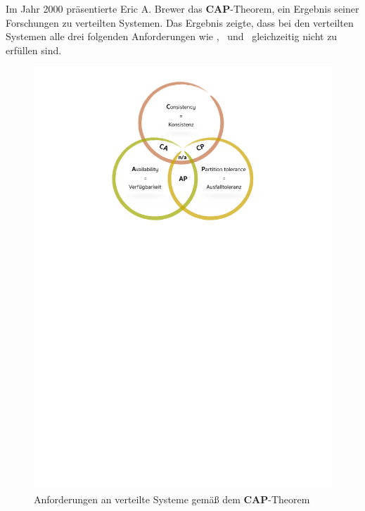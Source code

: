 Im Jahr 2000 präsentierte Eric A. Brewer das \textbf{CAP}-Theorem, ein Ergebnis seiner Forschungen zu verteilten Systemen. Das Ergebnis zeigte, dass bei den verteilten Systemen alle drei folgenden Anforderungen wie \Cap, \cAp\ und \caP\ gleichzeitig nicht zu erfüllen sind.

\begin{figure}[H]
\centering
\includegraphics[trim = 0mm 189mm 0mm 9mm, clip, width=1.0\textwidth]{resources/myPictureForCAP}
\caption[\textbf{CAP}-Theorem]{Anforderungen an verteilte Systeme gemäß dem \textbf{CAP}-Theorem}
\label{img:cap}
\end{figure}

